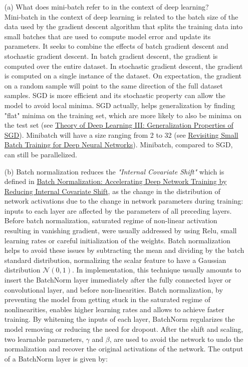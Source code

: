 \documentclass[11pt]{article}
\newcommand{\0}{\mat{0}}
\begin{document}
\begin{itemize}
    \item[(a)]   What does mini-batch refer to in the context of deep learning?\\
    Mini-batch in the context of deep learning is related to the batch size of the data used by the gradient descent algorithm that splits the training
    data into small batches that are used to compute model error and update its parameters. It seeks to combine the effects of batch gradient descent and stochastic gradient descent.
    In batch gradient descent, the gradient is computed over the entire dataset. In stochastic gradient descent, the gradient is computed on a single instance of the dataset. On expectation, the gradient on a random sample will point to the same direction of the full dataset samples. SGD is more efficient and its stochastic property  can allow the model to avoid local minima.  SGD actually, helps generalization by finding "flat" minima on the training set, which are more likely to also be minima on the test set (see \href{https://cbmm.mit.edu/sites/default/files/publications/CBMM-Memo-067.pdf}{Theory of Deep Learning III: Generalization Properties of SGD}). Minibatch will have a size ranging from 2 to 32 (see \href{https://arxiv.org/abs/1804.07612}{Revisiting Small Batch Training for Deep Neural Networks}). Minibatch, compared to SGD, can still be parallelized.
    \item[(b)]
    Batch normalization reduces the \textit{"Internal Covariate Shift"} which is defined in \href{https://arxiv.org/abs/1502.03167}{Batch Normalization: Accelerating Deep Network Training by Reducing Internal Covariate Shift}, as the change in the distribution of network activations due to the change in network parameters during training: inputs to each layer are affected by the parameters of all preceding layers. Before batch normalization, saturated regime of non-linear activation resulting in vanishing gradient, were usually addressed by using Relu, small learning rates or careful initialization of the weights. Batch normalization helps to avoid these issues by subtracting the mean and dividing by the batch standard distribution, normalizing the scalar feature to have a Gaussian distribution $\mathcal{N}(0,1)$.  In implementation, this technique usually amounts to insert the BatchNorm layer immediately after the fully connected layer or convolutional layer, and before non-linearities. Batch normalization, by preventing the model from getting stuck in the saturated regime of nonlinearities, enables higher learning rates and allows to achieve faster training. By whitening the inputs of  each layer, BatchNorm regularizes the model removing or reducing the need for dropout. After the shift and scaling, two learnable parameters, $\gamma$ and $\beta$, are used to avoid the network to undo the normalization and recover the original activations  of the network. The output of a BatchNorm layer is given by:

\end{itemize}
\end{document}
